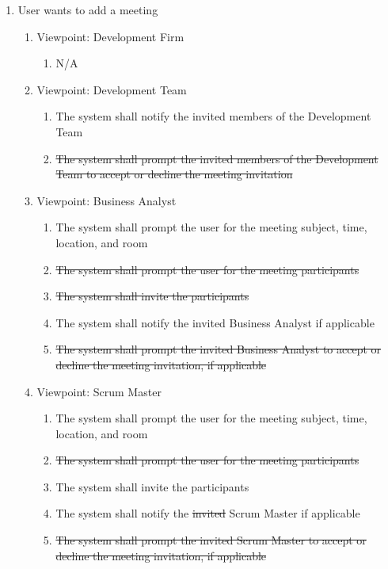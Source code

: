\documentclass[12pt, titlepage]{article}
\begin{document}
\begin{enumerate}[{BE}1.]
	\item User wants to add a meeting %
	\begin{enumerate}[{VP}1.] 
	    \item Viewpoint: Development Firm
	        \begin{enumerate}
	            \item[] N/A
	        \end{enumerate}
	    \item Viewpoint: Development Team
	        \begin{enumerate}
	            \item The system shall notify the invited members of the Development Team
	            \item \sout{The system shall prompt the invited members of the Development Team to accept or decline the meeting invitation}
	        \end{enumerate}
		\item Viewpoint: Business Analyst
			\begin{enumerate}
	            \item The system shall prompt the user for the meeting subject, time, location, and room
	            \item \sout{The system shall prompt the user for the meeting participants}
	            \item \sout{The system shall invite the participants}
	            \item The system shall notify the invited Business Analyst if applicable
	            \item \sout{The system shall prompt the invited Business Analyst to accept or decline the meeting invitation, if applicable}
			\end{enumerate}
		\item Viewpoint: Scrum Master
			\begin{enumerate}
	            \item The system shall prompt the user for the meeting subject, time, location, and room
	            \item \sout{The system shall prompt the user for the meeting participants}
	            \item The system shall invite the participants
	            \item The system shall notify the \sout{invited} Scrum Master if applicable
	            \item \sout{The system shall prompt the invited Scrum Master to accept or decline the meeting invitation, if applicable}
			\end{enumerate}
	\end{enumerate}
	

\end{enumerate}
\end{document}
